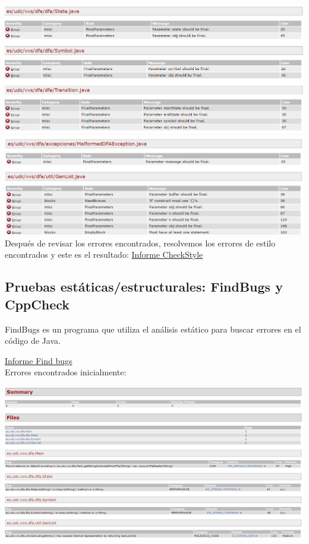 \documentclass[DIV=calc,paper=a4,fontsize=11pt,onecolumn]{scrartcl} %
\begin{document}
	\includegraphics[width=15cm]{Imagenes/statecheckstyle.png} \\
	\includegraphics[width=15cm]{Imagenes/checkStyleErrores3.png} \\
	Después de revisar los errores encontrados, resolvemos los errores de estilo encontrados y este es el resultado:
	  \href{Informes/checkStyle-report/checkstyle.html}{Informe CheckStyle} \\
	
	\subsection{Pruebas estáticas/estructurales: FindBugs y CppCheck}
	
	FindBugs es un programa que utiliza el análisis estático para buscar errores en el código de Java.
	
	\href{Informes/findBugs-report/findbugs.html}{Informe Find bugs} \\
	
	Errores encontrados inicialmente:
	
	\includegraphics[width=15cm]{Imagenes/findBugs1.png} \\
	
\end{document}
